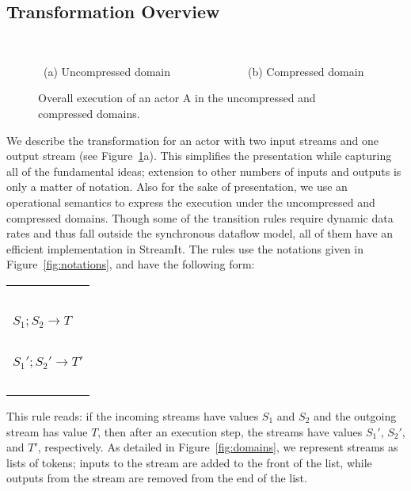 \subsection{Transformation Overview}

\begin{figure}[t]
~~

\mbox{~}(a) Uncompressed domain~~~~~~~~~~~~~~(b) Compressed domain
\caption{Overall execution of an actor A in the uncompressed and compressed domains.
\protect\label{fig:actor-pic}}
\end{figure}

We describe the transformation for an actor with two input streams and
one output stream (see Figure~\ref{fig:actor-pic}a).  This simplifies
the presentation while capturing all of the fundamental ideas;
extension to other numbers of inputs and outputs is only a matter of
notation.  Also for the sake of presentation, we use an operational
semantics to express the execution under the uncompressed and
compressed domains.  Though some of the transition rules require
dynamic data rates and thus fall outside the synchronous dataflow
model, all of them have an efficient implementation in StreamIt.  The
rules use the notations given in Figure~\ref{fig:notations}, and have
the following form:

\hspace{-12pt}\begin{tabular}{l} ~ \vspace{-6pt} \\ 
\hspace{-3pt}$S_1; S_2 \rightarrow T$ \hspace{-7pt}~\vspace{0.5pt} \\ \hline ~ \vspace{-7.5pt} \\
\hspace{-3pt}$S_1'; S_2' \rightarrow T'$ \hspace{-7pt} \\ ~ \vspace{-6pt} \\
\end{tabular}

This rule reads: if the incoming streams have values $S_1$ and $S_2$
and the outgoing stream has value $T$, then after an execution step,
the streams have values $S_1'$, $S_2'$, and $T'$, respectively.  As
detailed in Figure~\ref{fig:domains}, we represent streams as lists of
tokens; inputs to the stream are added to the front of the list, while
outputs from the stream are removed from the end of the list.

